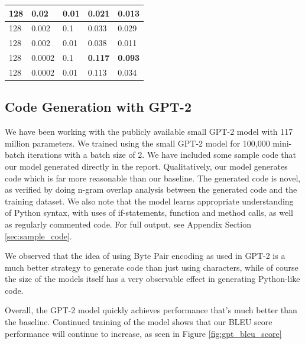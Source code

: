 \documentclass[10pt,twocolumn]{article}
\begin{document}
\begin{table}[!ht]
\begin{tabular}{lllll}
\multicolumn{1}{|l|}{128} & \multicolumn{1}{l|}{0.02}   & \multicolumn{1}{l|}{0.01} & \multicolumn{1}{l|}{0.021}          & \multicolumn{1}{l|}{0.013}          \\ \hline
\multicolumn{1}{|l|}{128} & \multicolumn{1}{l|}{0.002}  & \multicolumn{1}{l|}{0.1}  & \multicolumn{1}{l|}{0.033}          & \multicolumn{1}{l|}{0.029}          \\ \hline
\multicolumn{1}{|l|}{128} & \multicolumn{1}{l|}{0.002}  & \multicolumn{1}{l|}{0.01} & \multicolumn{1}{l|}{0.038}          & \multicolumn{1}{l|}{0.011}          \\ \hline
\multicolumn{1}{|l|}{128} & \multicolumn{1}{l|}{0.0002} & \multicolumn{1}{l|}{0.1}  & \multicolumn{1}{l|}{\textbf{0.117}} & \multicolumn{1}{l|}{\textbf{0.093}} \\ \hline
\multicolumn{1}{|l|}{128} & \multicolumn{1}{l|}{0.0002} & \multicolumn{1}{l|}{0.01} & \multicolumn{1}{l|}{0.113}          & \multicolumn{1}{l|}{0.034}          \\ \hline
\end{tabular}
\label{table:charr_rnn_sweep_label}
\end{table}

\subsection{Code Generation with GPT-2}
We have been working with the publicly available small GPT-2
model with 117 million parameters. We trained using the small GPT-2 model for 100,000 mini-batch iterations with a batch size of 2. We have included some sample code that our model generated directly in the report. Qualitatively, our model generates code which is far more reasonable than our baseline. The generated code is novel, as verified by doing n-gram overlap analysis between the generated code and the training dataset. We also note that the model learns appropriate understanding of Python syntax, with uses of if-statements, function and method calls, as well as regularly commented code. For full output, see Appendix Section \ref{sec:sample_code}.

We observed that the idea of using Byte Pair encoding as used in GPT-2 is a much better strategy to generate code than just using characters, while of course the size of the models itself has a very observable effect in generating Python-like code.

Overall, the GPT-2 model quickly achieves performance that's much better than the baseline. Continued training of the model shows that our BLEU score performance will continue to increase, as seen in Figure \ref{fig:gpt_bleu_score}
\end{document}
